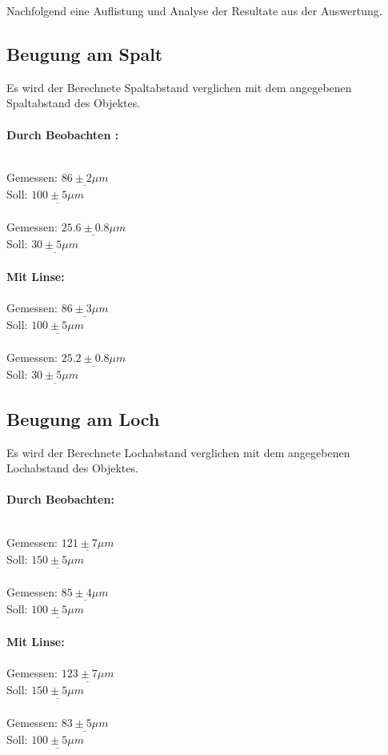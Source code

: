 Nachfolgend eine Auflistung und Analyse der Resultate aus der Auswertung.\\

\subsection{Beugung am Spalt}
Es wird der Berechnete Spaltabstand verglichen mit dem angegebenen Spaltabstand des Objektes.\\
\\
\textbf{Durch Beobachten :}
\begin{tabbing}
\hspace{40mm}			\=  	\\
Gemessen: \> $\underline{86\pm 2\mu m}$			\\
Soll:	\> $\underline{100\pm 5 \mu m}$			\\
\\
Gemessen: \> $\underline{25.6 \pm 0.8\mu m}$		\\
Soll:	  \> $\underline{30 \pm 5\mu m}$			\\
\\
\textbf{Mit Linse:}		\\
\\
Gemessen: \> $\underline{86\pm 3\mu m}$			\\
Soll:	\> $\underline{100\pm 5 \mu m}$			\\
\\
Gemessen: \> $\underline{25.2 \pm 0.8\mu m}$		\\
Soll:	\> $\underline{30 \pm 5\mu m}$			\\
\end{tabbing}

\subsection{Beugung am Loch}
Es wird der Berechnete Lochabstand verglichen mit dem angegebenen Lochabstand des Objektes.\\
\\
\textbf{Durch Beobachten:}
\begin{tabbing}
\hspace{40mm}			\=  	\\
Gemessen: \> $\underline{121 \pm 7\mu m}$			\\
Soll:	\> $\underline{150 \pm 5 \mu m}$			\\
\\
Gemessen: \> $\underline{85 \pm 4\mu m}$		\\
Soll:	\> $\underline{100 \pm 5\mu m}$			\\
\\
\textbf{Mit Linse:}		\\
\\
Gemessen: \> $\underline{123 \pm 7\mu m}$			\\
Soll:	\> $\underline{150\pm 5 \mu m}$			\\
\\
Gemessen: \> $\underline{83 \pm 5\mu m}$		\\
Soll:	\> $\underline{100 \pm 5\mu m}$			\\
\end{tabbing}

